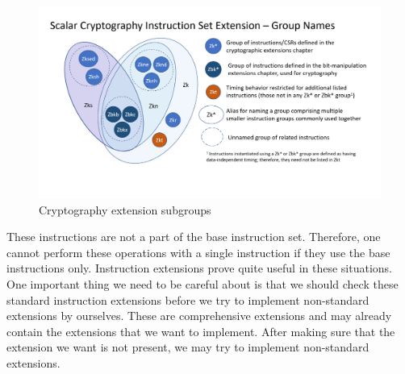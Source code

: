\begin{figure}
    \centering
    \includegraphics{riscv/cryptography_extension_subgroups.png}
    \caption{Cryptography extension subgroups \cite{cryptogroupsdiag}}
    \label{fig:cryptography_extension_subgroups}
\end{figure}

These instructions are not a part of the base instruction set. Therefore, one cannot perform these operations with a single instruction if they use the base instructions only. Instruction extensions prove quite useful in these situations. One important thing we need to be careful about is that we should check these standard instruction extensions before we try to implement non-standard extensions by ourselves. These are comprehensive extensions and may already contain the extensions that we want to implement. After making sure that the extension we want is not present, we may try to implement non-standard extensions.
